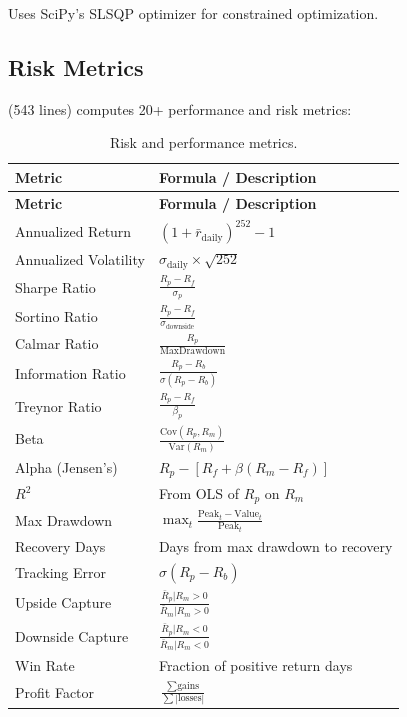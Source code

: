 Uses SciPy's SLSQP optimizer for constrained optimization.

\subsection{Risk Metrics}

 (543 lines) computes 20+ performance and risk metrics:

\begin{longtable}{lp{8cm}}
\caption{Risk and performance metrics.} \label{tab:risk-metrics} \\
\toprule
\textbf{Metric} & \textbf{Formula / Description} \\
\midrule
\endfirsthead
\toprule
\textbf{Metric} & \textbf{Formula / Description} \\
\midrule
\endhead
Annualized Return & $(1 + \bar{r}_{\text{daily}})^{252} - 1$ \\
Annualized Volatility & $\sigma_{\text{daily}} \times \sqrt{252}$ \\
Sharpe Ratio & $\frac{R_p - R_f}{\sigma_p}$ \\
Sortino Ratio & $\frac{R_p - R_f}{\sigma_{\text{downside}}}$ \\
Calmar Ratio & $\frac{R_p}{\text{MaxDrawdown}}$ \\
Information Ratio & $\frac{R_p - R_b}{\sigma(R_p - R_b)}$ \\
Treynor Ratio & $\frac{R_p - R_f}{\beta_p}$ \\
Beta & $\frac{\text{Cov}(R_p, R_m)}{\text{Var}(R_m)}$ \\
Alpha (Jensen's) & $R_p - [R_f + \beta(R_m - R_f)]$ \\
$R^2$ & From OLS of $R_p$ on $R_m$ \\
Max Drawdown & $\max_t \frac{\text{Peak}_t - \text{Value}_t}{\text{Peak}_t}$ \\
Recovery Days & Days from max drawdown to recovery \\
Tracking Error & $\sigma(R_p - R_b)$ \\
Upside Capture & $\frac{\bar{R}_p | R_m > 0}{\bar{R}_m | R_m > 0}$ \\
Downside Capture & $\frac{\bar{R}_p | R_m < 0}{\bar{R}_m | R_m < 0}$ \\
Win Rate & Fraction of positive return days \\
Profit Factor & $\frac{\sum \text{gains}}{\sum |\text{losses}|}$ \\
\bottomrule
\end{longtable}

